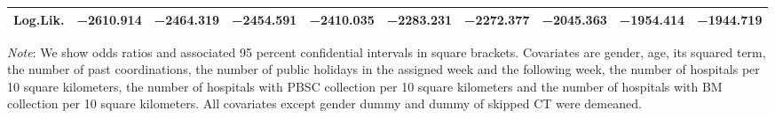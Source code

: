 \documentclass[12pt, a4paper]{article}
\begin{document}
\begin{landscape}
\begin{table}[H]
\begin{threeparttable}
\begin{tabular}[t]{lccccccccc}
Log.Lik. & \num{-2610.914} & \num{-2464.319} & \num{-2454.591} & \num{-2410.035} & \num{-2283.231} & \num{-2272.377} & \num{-2045.363} & \num{-1954.414} & \num{-1944.719}\\
\bottomrule
\end{tabular}
\begin{tablenotes}
\item \emph{Note}: We show odds ratios and associated 95 percent confidential intervals in square brackets. Covariates are gender, age, its squared term, the number of past coordinations, the number of public holidays in the assigned week and the following week, the number of hospitals per 10 square kilometers, the number of hospitals with PBSC collection per 10 square kilometers and the number of hospitals with BM collection per 10 square kilometers. All covariates except gender dummy and dummy of skipped CT were demeaned.
\end{tablenotes}
\end{threeparttable}
\end{table}
\end{landscape}

\clearpage
\end{document}
